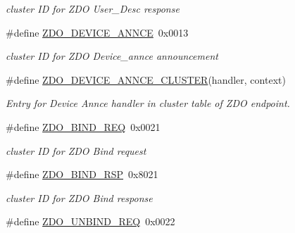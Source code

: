 \begin{DoxyCompactItemize}
\begin{DoxyCompactList}\small\item\em cluster I\-D for Z\-D\-O User\-\_\-\-Desc response \end{DoxyCompactList}\item 
\hypertarget{group__zdo_gaffd566d5fc7aa21973fd7e5e026db30a}{\#define \hyperlink{group__zdo_gaffd566d5fc7aa21973fd7e5e026db30a}{Z\-D\-O\-\_\-\-D\-E\-V\-I\-C\-E\-\_\-\-A\-N\-N\-C\-E}~0x0013}\label{group__zdo_gaffd566d5fc7aa21973fd7e5e026db30a}

\begin{DoxyCompactList}\small\item\em cluster I\-D for Z\-D\-O Device\-\_\-annce announcement \end{DoxyCompactList}\item 
\#define \hyperlink{group__zdo_ga6f85faaf451b834c9b01ad0e3700ec9f}{Z\-D\-O\-\_\-\-D\-E\-V\-I\-C\-E\-\_\-\-A\-N\-N\-C\-E\-\_\-\-C\-L\-U\-S\-T\-E\-R}(handler, context)
\begin{DoxyCompactList}\small\item\em Entry for Device Annce handler in cluster table of Z\-D\-O endpoint. \end{DoxyCompactList}\item 
\hypertarget{group__zdo_ga9e97bead2ca9d929bb94183ddc2106bb}{\#define \hyperlink{group__zdo_ga9e97bead2ca9d929bb94183ddc2106bb}{Z\-D\-O\-\_\-\-B\-I\-N\-D\-\_\-\-R\-E\-Q}~0x0021}\label{group__zdo_ga9e97bead2ca9d929bb94183ddc2106bb}

\begin{DoxyCompactList}\small\item\em cluster I\-D for Z\-D\-O Bind request \end{DoxyCompactList}\item 
\hypertarget{group__zdo_gaf896a1b673d2325dfa32c691e22b5e0d}{\#define \hyperlink{group__zdo_gaf896a1b673d2325dfa32c691e22b5e0d}{Z\-D\-O\-\_\-\-B\-I\-N\-D\-\_\-\-R\-S\-P}~0x8021}\label{group__zdo_gaf896a1b673d2325dfa32c691e22b5e0d}

\begin{DoxyCompactList}\small\item\em cluster I\-D for Z\-D\-O Bind response \end{DoxyCompactList}\item 
\hypertarget{group__zdo_gad447486341b5d51d91f5a44aad418a99}{\#define \hyperlink{group__zdo_gad447486341b5d51d91f5a44aad418a99}{Z\-D\-O\-\_\-\-U\-N\-B\-I\-N\-D\-\_\-\-R\-E\-Q}~0x0022}\label{group__zdo_gad447486341b5d51d91f5a44aad418a99}


\end{DoxyCompactItemize}
